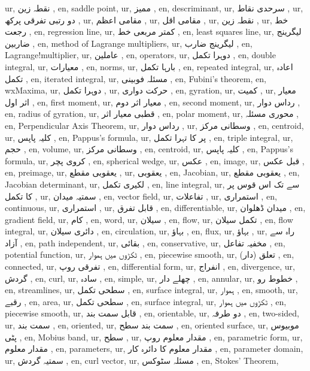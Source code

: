 ur, نقطہ زین ,
en, saddle point,
ur, ممیز ,
en, descriminant,
ur, سرحدی نقاط ,
ur, دو رتبی تفرقی پرکھ ,
ur,  مقامی اعظم  ,
ur, مقامی اقل ,
ur, نقطہ زین ,
ur, خط رجعت ,
en, regression line,
ur, کمتر مربعی خط ,
en, least squares line,
ur, لیگرینج ضاربین ,
en, method of Lagrange multipliers,
ur, لیگرینج ضارب ,
en, Lagrange!multiplier,
ur,  عاملین ,
en, operators,
ur, دوہرا تکمل ,
en, double integral,
ur, معیارات  ,
en, norms,
ur, بارہا تکمل ,
en, repeated integral,
ur, اعادہ تکمل ,
en, iterated integral,
ur, مسئلہ فوبینی  ,
en, Fubini's theorem,
en, wxMaxima,
ur,  دوہرا تکمل ,
ur, حرکت دواری ,
en, gyration,
ur, کمیت ,
ur, معیار اثر اول ,
en, first moment,
ur,  معیار اثر دوم ,
en, second moment,
ur,  رداس دوار ,
en, radius of gyration,
ur, قطبی معیار اثر ,
en, polar moment,
ur,  محوری مسئلہ ,
en, Perpendicular Axis Theorem,
ur, رداس دوار ,
ur, وسطانی مرکز ,
en, centroid,
ur, کلیہ پاپس ,
en, Pappus's formula,
ur,   پر  کا تہرا تکمل ,
en, triple integral,
ur, حجم ,
en, volume,
ur, وسطانی مرکز ,
en, centroid,
ur, کلیہ پاپس ,
en, Pappus's formula,
ur, کروی پچر ,
en, spherical wedge,
ur, عکس ,
en, image,
ur, قبل عکس ,
en, preimage,
ur, یعقوبی مقطع ,
ur, یعقوبی ,
en, Jacobian,
ur, یعقوبی مقطع ,
en, Jacobian determinant,
ur, لکیری تکمل ,
en, line integral,
ur,   سے  تک اس قوس پر  کا تکمل ,
ur, سمتیہ میدان ,
en, vector field,
ur,  تفاعلات ,
ur, استمراری  ,
en, continuous,
ur, استمراری  ,
ur, قابل تفرق ,
en, differentiable,
ur, میدان ڈھلوان ,
en, gradient field,
ur, کام  ,
en, word,
ur, سیلان ,
en, flow,
ur, تکمل سیلان ,
en, flow integral,
ur, دائری سیلان ,
en, circulation,
ur, بہاؤ ,
en, flux,
ur, بہاؤ ,
ur, راہ سے آزاد ,
en, path independent,
ur, بقائی ,
en, conservative,
ur, مخفیہ تفاعل ,
en, potential function,
ur, ٹکڑوں میں ہموار ,
en, piecewise smooth,
ur, تعلق (دار) ,
en, connected,
ur, تفرقی روپ ,
en, differential form,
ur, انفراج ,
en, divergence,
ur, گردش ,
en, curl,
ur, سادہ  ,
en, simple,
ur,  چھلے دار  ,
en, annular,
ur, خطوط رو ,
en, streamlines,
ur,  سطحی تکمل ,
en, surface integral,
ur, ہموار  ,
en, smooth,
ur,  رقبے  ,
en, area,
ur,  سطحی تکمل  ,
en, surface integral,
ur, ٹکڑوں میں ہموار ,
en, piecewise smooth,
ur, قابل سمت بند  ,
en, orientable,
ur,  دو طرفہ  ,
en, two-sided,
ur, سمت بند  ,
en, oriented,
ur, سمت بند سطح  ,
en, oriented surface,
ur,  موبیوس پٹی  ,
en, Mobius band,
ur, سطح  ,
ur, مقدار معلوم روپ ,
en, parametric form,
ur, مقدار معلوم ,
en, parameters,
ur, مقدار معلوم کا دائرہ کار ,
en, parameter domain,
ur, سمتیہ گردش ,
en, curl vector,
ur, مسئلہ سٹوکس  ,
en, Stokes’ Theorem,
